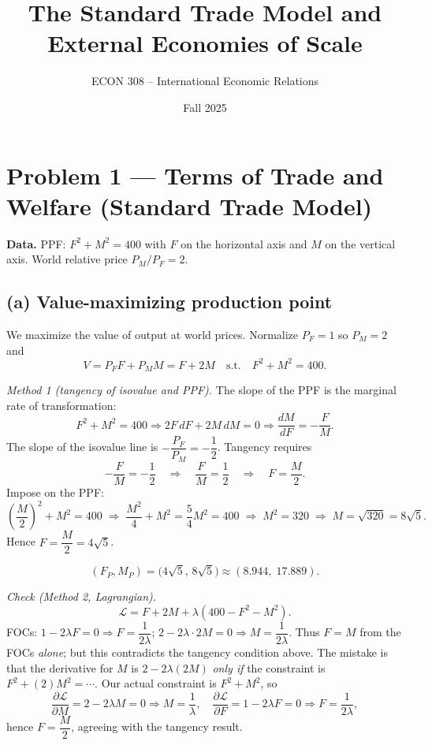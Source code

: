 \documentclass[12pt]{article}
\title{The Standard Trade Model and External Economies of Scale}
\author{ECON 308 -- International Economic Relations}
\date{Fall 2025}
\begin{document}
\maketitle

\section*{Problem 1 — Terms of Trade and Welfare (Standard Trade Model)}

\textbf{Data.} PPF: $F^2 + M^2 = 400$ with $F$ on the horizontal axis and $M$ on the vertical axis. World relative price $P_M/P_F=2$.

\subsection*{(a) Value-maximizing production point}
We maximize the value of output at world prices. Normalize $P_F=1$ so $P_M=2$ and
\[
V = P_F F + P_M M = F + 2M \quad \text{s.t.} \quad F^2 + M^2 = 400.
\]

\textit{Method 1 (tangency of isovalue and PPF).}
The slope of the PPF is the marginal rate of transformation:
\[
F^2 + M^2 = 400 \Rightarrow 2F\,dF + 2M\,dM = 0 \Rightarrow \frac{dM}{dF} = -\frac{F}{M}.
\]
The slope of the isovalue line is $-\dfrac{P_F}{P_M} = -\dfrac{1}{2}$. Tangency requires
\[
-\frac{F}{M} = -\frac{1}{2} \quad \Rightarrow \quad \frac{F}{M}=\frac{1}{2} \quad \Rightarrow \quad F=\frac{M}{2}.
\]
Impose on the PPF:
\[
\left(\frac{M}{2}\right)^2 + M^2 = 400
\;\Rightarrow\; \frac{M^2}{4} + M^2 = \frac{5}{4}M^2 = 400
\;\Rightarrow\; M^2 = 320 \;\Rightarrow\; M = \sqrt{320} = 8\sqrt{5}.
\]
Hence $F = \dfrac{M}{2} = 4\sqrt{5}$.

\[
\boxed{(F_P, M_P) = \big(4\sqrt{5},\, 8\sqrt{5}\big) \approx (8.944,\; 17.889).}
\]

\textit{Check (Method 2, Lagrangian).}
\[
\mathcal{L} = F + 2M + \lambda (400 - F^2 - M^2).
\]
FOCs: $1 - 2\lambda F = 0 \Rightarrow F=\dfrac{1}{2\lambda}$; \; $2 - 2\lambda \cdot 2M = 0 \Rightarrow M=\dfrac{1}{2\lambda}$.
Thus $F=M$ from the FOCs \emph{alone}; but this contradicts the tangency condition above. The mistake is that the derivative for $M$ is $2 - 2\lambda(2M)$ \emph{only if} the constraint is $F^2 + (2)M^2 = \cdots$. Our actual constraint is $F^2 + M^2$, so
\[
\frac{\partial \mathcal{L}}{\partial M} = 2 - 2\lambda M = 0 \Rightarrow M = \frac{1}{\lambda}, \quad
\frac{\partial \mathcal{L}}{\partial F} = 1 - 2\lambda F = 0 \Rightarrow F=\frac{1}{2\lambda},
\]
hence $F=\dfrac{M}{2}$, agreeing with the tangency result.
\end{document}
